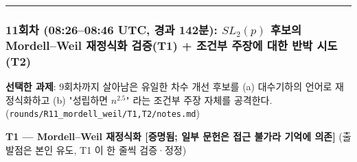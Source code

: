 \begin{center}\rule{0.5\linewidth}{0.5pt}\end{center}

\hypertarget{uxd68cuxcc28-08260846-utc-uxacbduxacfc-142uxbd84-sl_2p-uxd6c4uxbcf4uxc758-mordellweil-uxc7acuxc815uxc2dduxd654-uxac80uxc99dt1-uxc870uxac74uxbd80-uxc8fcuxc7a5uxc5d0-uxb300uxd55c-uxbc18uxbc15-uxc2dcuxb3c4t2}{%
\subsubsection*{\texorpdfstring{11회차 (08:26--08:46 UTC, 경과 142분): \(SL_2(p)\) 후보의 Mordell--Weil 재정식화 검증(T1) + 조건부 주장에 대한 반박 시도(T2)}{11회차 (08:26--08:46 UTC, 경과 142분): SL\_2(p) 후보의 Mordell--Weil 재정식화 검증(T1) + 조건부 주장에 대한 반박 시도(T2)}}\label{uxd68cuxcc28-08260846-utc-uxacbduxacfc-142uxbd84-sl_2p-uxd6c4uxbcf4uxc758-mordellweil-uxc7acuxc815uxc2dduxd654-uxac80uxc99dt1-uxc870uxac74uxbd80-uxc8fcuxc7a5uxc5d0-uxb300uxd55c-uxbc18uxbc15-uxc2dcuxb3c4t2}}

\textbf{선택한 과제}: 9회차까지 살아남은 유일한 차수 개선 후보를 (a) 대수기하의 언어로 재정식화하고 (b) "성립하면 \(n^{2.5}\)" 라는 조건부 주장 자체를 공격한다. (\texttt{rounds/R11\_mordell\_weil/T1,T2/notes.md})

\textbf{T1 --- Mordell--Weil 재정식화 {[}증명됨; 일부 문헌은 접근 불가라 기억에 의존{]}} (출발점은 본인 유도, T1 이 한 줄씩 검증·정정)

